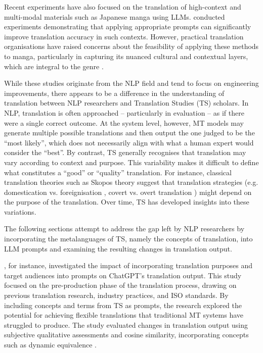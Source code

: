 \documentclass[output=paper,colorlinks,citecolor=brown, japanesefont]{langscibook}
\begin{document}
Recent experiments have also focused on the translation of high-context and multi-modal materials such as Japanese manga using LLMs. \textcite{Yang2024} conducted experiments demonstrating that applying appropriate prompts can significantly improve translation accuracy in such contexts. However, practical translation organisations have raised concerns about the feasibility of applying these methods to manga, particularly in capturing its nuanced cultural and contextual layers, which are integral to the genre \citep{JAT2024}.

While these studies originate from the NLP field and tend to focus on engineering improvements, there appears to be a difference in the understanding of translation between NLP researchers and Translation Studies (TS) scholars. In NLP, translation is often approached -- particularly in evaluation -- as if there were a single correct outcome. At the system level, however, MT models may generate multiple possible translations and then output the one judged to be the ``most likely'', which does not necessarily align with what a human expert would consider the ``best''. By contrast, TS generally recognises that translation may vary according to context and purpose. This variability makes it difficult to define what constitutes a ``good'' or ``quality'' translation. For instance, classical translation theories such as Skopos theory suggest that translation strategies (e.g. domestication vs. foreignisation \citep{Venuti1995}, covert vs. overt translation \citep{House1981}) might depend on the purpose of the translation. Over time, TS has developed insights into these variations.

The following sections attempt to address the gap left by NLP researchers by incorporating the metalanguages of TS, namely the concepts of translation, into LLM prompts and examining the resulting changes in translation output. 

\textcite{yamada-2023-optimizing}, for instance,  investigated the impact of incorporating translation purposes and target audiences into prompts on ChatGPT's translation output. This study focused on the pre-production phase of the translation process, drawing on previous translation research, industry practices, and ISO standards. By including concepts and terms from TS as prompts, the research explored the potential for achieving flexible translations that traditional MT systems have struggled to produce. The study evaluated changes in translation output using subjective qualitative assessments and cosine similarity, incorporating concepts such as dynamic equivalence \citep{Nida1969}.
\end{document}

